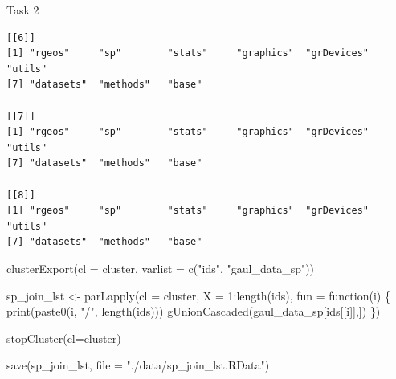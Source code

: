 \documentclass[
  ignorenonframetext,
  aspectratio=169,
]{beamer}
\newenvironment{Shaded}{\begin{snugshade}}{\end{snugshade}}
\newcommand{\AttributeTok}[1]{\textcolor[rgb]{0.40,0.45,0.13}{#1}}
\newcommand{\ControlFlowTok}[1]{\textcolor[rgb]{0.00,0.23,0.31}{#1}}
\newcommand{\DecValTok}[1]{\textcolor[rgb]{0.68,0.00,0.00}{#1}}
\newcommand{\FunctionTok}[1]{\textcolor[rgb]{0.28,0.35,0.67}{#1}}
\newcommand{\NormalTok}[1]{\textcolor[rgb]{0.00,0.23,0.31}{#1}}
\newcommand{\OtherTok}[1]{\textcolor[rgb]{0.00,0.23,0.31}{#1}}
\newcommand{\SpecialCharTok}[1]{\textcolor[rgb]{0.37,0.37,0.37}{#1}}
\newcommand{\StringTok}[1]{\textcolor[rgb]{0.13,0.47,0.30}{#1}}
\begin{document}
\begin{frame}[fragile]{Task 2}
\begin{verbatim}
[[6]]
[1] "rgeos"     "sp"        "stats"     "graphics"  "grDevices" "utils"    
[7] "datasets"  "methods"   "base"     

[[7]]
[1] "rgeos"     "sp"        "stats"     "graphics"  "grDevices" "utils"    
[7] "datasets"  "methods"   "base"     

[[8]]
[1] "rgeos"     "sp"        "stats"     "graphics"  "grDevices" "utils"    
[7] "datasets"  "methods"   "base"     
\end{verbatim}

\begin{Shaded}
\begin{Highlighting}[]
\FunctionTok{clusterExport}\NormalTok{(}\AttributeTok{cl =}\NormalTok{ cluster, }\AttributeTok{varlist =} \FunctionTok{c}\NormalTok{(}\StringTok{"ids"}\NormalTok{, }\StringTok{"gaul\_data\_sp"}\NormalTok{))}

\NormalTok{sp\_join\_lst }\OtherTok{\textless{}{-}} \FunctionTok{parLapply}\NormalTok{(}\AttributeTok{cl =}\NormalTok{ cluster, }\AttributeTok{X =} \DecValTok{1}\SpecialCharTok{:}\FunctionTok{length}\NormalTok{(ids), }\AttributeTok{fun =} \ControlFlowTok{function}\NormalTok{(i) \{}
  \FunctionTok{print}\NormalTok{(}\FunctionTok{paste0}\NormalTok{(i, }\StringTok{"/"}\NormalTok{, }\FunctionTok{length}\NormalTok{(ids)))}
  \FunctionTok{gUnionCascaded}\NormalTok{(gaul\_data\_sp[ids[[i]],])}
\NormalTok{\})}

\FunctionTok{stopCluster}\NormalTok{(}\AttributeTok{cl=}\NormalTok{cluster)}

\FunctionTok{save}\NormalTok{(sp\_join\_lst, }\AttributeTok{file =} \StringTok{"./data/sp\_join\_lst.RData"}\NormalTok{)}
\end{Highlighting}
\end{Shaded}

\linespread{2}

\linespread{0.5}


\end{frame}
\end{document}
